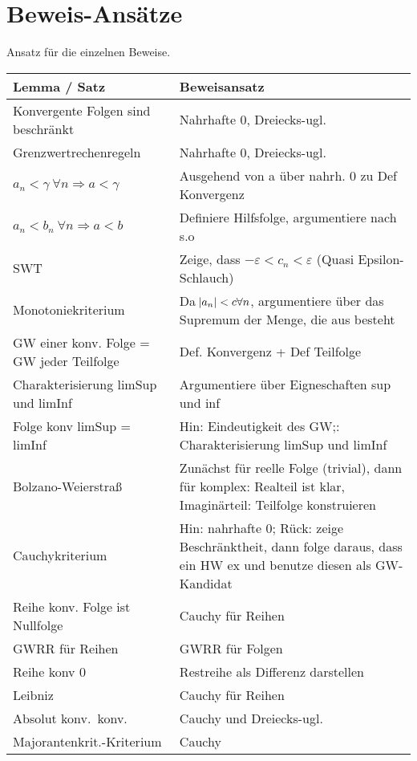 \documentclass[10pt]{article}
\begin{document}
    \section{Beweis-Ansätze}
    Ansatz für die einzelnen Beweise.
    \begin{center}
        \begin{tabular}{lp{5cm}}
            \toprule
                Lemma / Satz & Beweisansatz\\
            \midrule
                Konvergente Folgen sind beschränkt & Nahrhafte 0, Dreiecks-ugl.\\
                Grenzwertrechenregeln & Nahrhafte 0, Dreiecks-ugl. \\
                $a_n < \gamma\ \forall n \Rightarrow a < \gamma$  & Ausgehend von a über nahrh. 0 zu Def Konvergenz \\
                $a_n < b_n\ \forall n \Rightarrow a<b$ & Definiere Hilfsfolge, argumentiere nach s.o \\
                SWT & Zeige, dass $-\varepsilon < c_n < \varepsilon$  (Quasi Epsilon-Schlauch) \\
                Monotoniekriterium & Da $\abs{a_n} < c \forall n$, argumentiere über das Supremum der Menge, die aus  besteht \\
                GW einer konv. Folge = GW jeder Teilfolge & Def. Konvergenz + Def Teilfolge \\
                Charakterisierung limSup und limInf & Argumentiere über Eigneschaften sup und inf \\
                Folge konv limSup = limInf & Hin: Eindeutigkeit des GW;: Charakterisierung limSup und limInf \\
                Bolzano-Weierstraß & Zunächst für reelle Folge (trivial), dann für komplex: Realteil ist klar, Imaginärteil: Teilfolge konstruieren \\
                Cauchykriterium & Hin: nahrhafte 0; Rück: zeige Beschränktheit, dann folge daraus, dass ein HW ex und benutze diesen als GW-Kandidat \\
                Reihe konv.  Folge ist Nullfolge & Cauchy für Reihen \\
                GWRR für Reihen & GWRR für Folgen \\
                Reihe konv  0 & Restreihe als Differenz darstellen \\
                Leibniz & Cauchy für Reihen \\
                Absolut konv.\  konv. & Cauchy und Dreiecks-ugl.\\
                Majorantenkrit.-Kriterium & Cauchy\\
            \bottomrule
        \end{tabular}
    \end{center}
\end{document}
